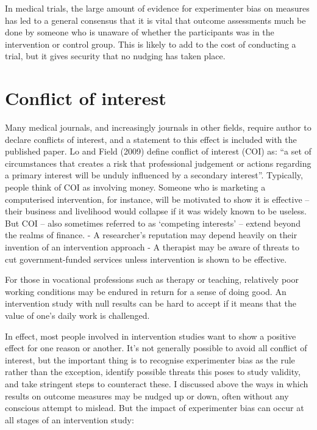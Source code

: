 \documentclass[]{book}
\begin{document}
In medical trials, the large amount of evidence for experimenter bias on measures has led to a general consensus that it is vital that outcome assessments much be done by someone who is unaware of whether the participants was in the intervention or control group. This is likely to add to the cost of conducting a trial, but it gives security that no nudging has taken place.

\hypertarget{conflict-of-interest}{%
\section{Conflict of interest}\label{conflict-of-interest}}

Many medical journals, and increasingly journals in other fields, require author to declare conflicts of interest, and a statement to this effect is included with the published paper. Lo and Field (2009) define conflict of interest (COI) as:
``a set of circumstances that creates a risk that professional judgement or actions regarding a primary interest will be unduly influenced by a secondary interest''.
Typically, people think of COI as involving money. Someone who is marketing a computerised intervention, for instance, will be motivated to show it is effective -- their business and livelihood would collapse if it was widely known to be useless. But COI -- also sometimes referred to as `competing interests' -- extend beyond the realms of finance.
- A researcher's reputation may depend heavily on their invention of an intervention approach
- A therapist may be aware of threats to cut government-funded services unless intervention is shown to be effective.

For those in vocational professions such as therapy or teaching, relatively poor working conditions may be endured in return for a sense of doing good. An intervention study with null results can be hard to accept if it means that the value of one's daily work is challenged.

In effect, most people involved in intervention studies want to show a positive effect for one reason or another. It's not generally possible to avoid all conflict of interest, but the important thing is to recognise experimenter bias as the rule rather than the exception, identify possible threats this poses to study validity, and take stringent steps to counteract these. I discussed above the ways in which results on outcome measures may be nudged up or down, often without any conscious attempt to mislead. But the impact of experimenter bias can occur at all stages of an intervention study:
\end{document}
